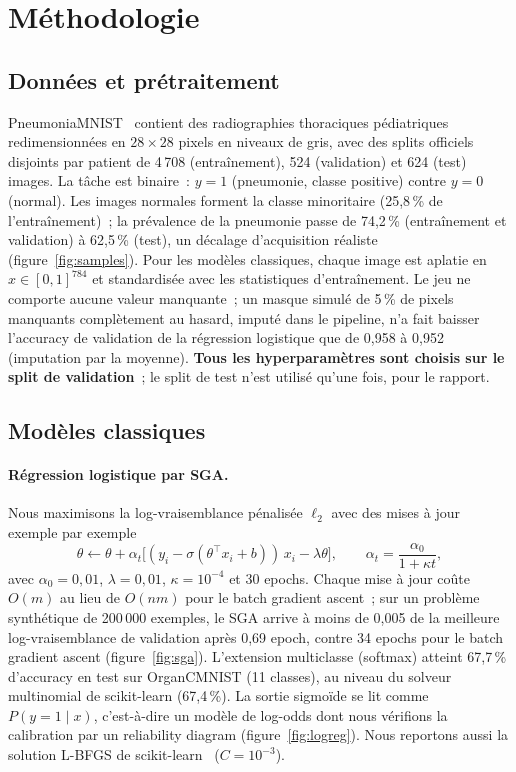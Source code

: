 \documentclass[11pt,a4paper]{article}
\begin{document}
\section{Méthodologie}
\subsection{Données et prétraitement}
PneumoniaMNIST~\cite{yang2023medmnist} contient des radiographies thoraciques pédiatriques~\cite{kermany2018identifying}
redimensionnées en $28\times28$ pixels en niveaux de gris, avec des splits officiels disjoints par patient de
4\,708 (entraînement), 524 (validation) et 624 (test) images. La tâche est binaire~: $y=1$ (pneumonie, classe positive)
contre $y=0$ (normal). Les images normales forment la classe minoritaire (25,8\,\% de l'entraînement)~; la prévalence de
la pneumonie passe de 74,2\,\% (entraînement et validation) à 62,5\,\% (test), un décalage d'acquisition réaliste
(figure~\ref{fig:samples}). Pour les modèles classiques, chaque image est aplatie en $x\in[0,1]^{784}$ et standardisée
avec les statistiques d'entraînement. Le jeu ne comporte aucune valeur manquante~; un masque simulé de 5\,\% de pixels
manquants complètement au hasard, imputé dans le pipeline, n'a fait baisser l'accuracy de validation de la régression
logistique que de 0,958 à 0,952 (imputation par la moyenne). \textbf{Tous les hyperparamètres sont choisis sur le
split de validation}~; le split de test n'est utilisé qu'une fois, pour le rapport.

\subsection{Modèles classiques}
\paragraph{Régression logistique par SGA.} Nous maximisons la log-vraisemblance pénalisée $\ell_2$ avec des mises à jour
exemple par exemple
\begin{equation}
  \theta \leftarrow \theta + \alpha_t\big[(y_i - \sigma(\theta^\top x_i + b))\,x_i - \lambda\theta\big],\qquad
  \alpha_t = \frac{\alpha_0}{1+\kappa t},
\end{equation}
avec $\alpha_0=0{,}01$, $\lambda=0{,}01$, $\kappa=10^{-4}$ et 30 epochs. Chaque mise à jour coûte $O(m)$ au lieu de
$O(nm)$ pour le batch gradient ascent~; sur un problème synthétique de 200\,000 exemples, le SGA arrive à moins de
0,005 de la meilleure log-vraisemblance de validation après 0,69 epoch, contre 34 epochs pour le batch
gradient ascent (figure~\ref{fig:sga}). L'extension multiclasse (softmax) atteint 67,7\,\% d'accuracy en test sur
OrganCMNIST (11 classes), au niveau du solveur multinomial de scikit-learn (67,4\,\%). La sortie sigmoïde se lit comme
$P(y=1\mid x)$, c'est-à-dire un modèle de log-odds dont nous vérifions la calibration par un reliability diagram
(figure~\ref{fig:logreg}). Nous reportons aussi la solution L-BFGS de scikit-learn~\cite{pedregosa2011scikit}
($C=10^{-3}$).
\end{document}
